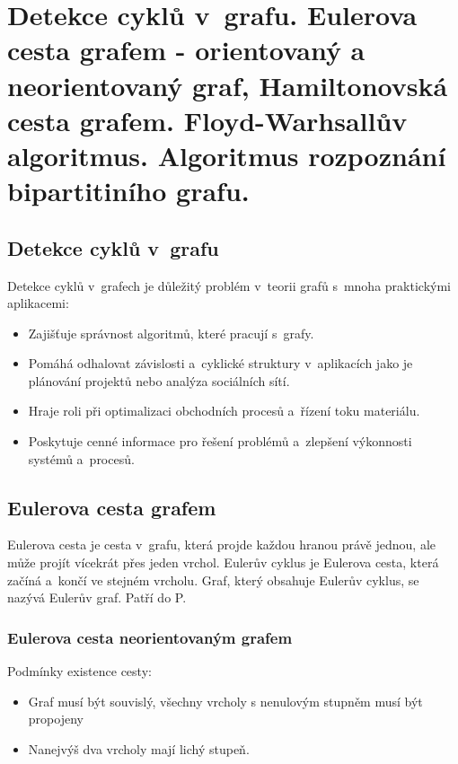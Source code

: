 \clearpage
\section{Detekce cyklů v~grafu. Eulerova cesta grafem - orientovaný a neorientovaný graf, Hamiltonovská cesta grafem. Floyd-Warhsallův algoritmus. Algoritmus rozpoznání bipartitiního grafu.}

\subsection{Detekce cyklů v~grafu}

Detekce cyklů v~grafech je důležitý problém v~teorii grafů s~mnoha praktickými aplikacemi:

\begin{itemize}
    \item Zajišťuje správnost algoritmů, které pracují s~grafy.
    \item Pomáhá odhalovat závislosti a~cyklické struktury v~aplikacích jako je plánování projektů nebo analýza sociálních sítí.
    \item Hraje roli při optimalizaci obchodních procesů a~řízení toku materiálu.
    \item Poskytuje cenné informace pro řešení problémů a~zlepšení výkonnosti systémů a~procesů.
\end{itemize}

\subsection{Eulerova cesta grafem}

Eulerova cesta je cesta v~grafu, která projde každou hranou právě jednou, ale může projít vícekrát přes jeden vrchol. Eulerův cyklus je 
Eulerova cesta, která začíná a~končí ve stejném vrcholu. Graf, který obsahuje Eulerův cyklus, se nazývá Eulerův graf. Patří do P.

\subsubsection{Eulerova cesta neorientovaným grafem}
Podmínky existence cesty:
\begin{itemize}
    \item Graf musí být souvislý, všechny vrcholy s nenulovým stupněm musí být propojeny
    \item Nanejvýš dva vrcholy mají lichý stupeň.
\end{itemize}

